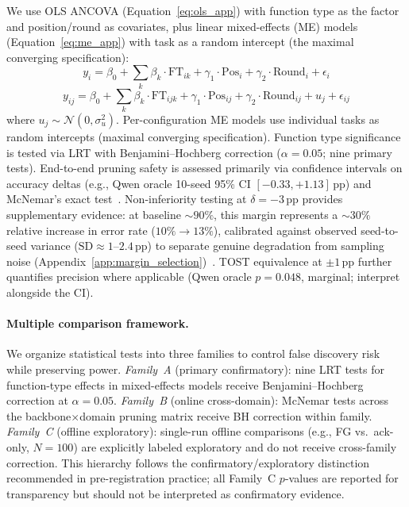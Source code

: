 We use OLS ANCOVA (Equation~\ref{eq:ols_app}) with function type as the factor and position/round as covariates, plus linear mixed-effects (ME) models (Equation~\ref{eq:me_app}) with task as a random intercept (the maximal converging specification):
\begin{equation}
    y_i = \beta_0 + \textstyle\sum_{k} \beta_k \cdot \text{FT}_{ik} + \gamma_1 \cdot \text{Pos}_i + \gamma_2 \cdot \text{Round}_i + \epsilon_i
\label{eq:ols_app}
\end{equation}
\begin{equation}
    y_{ij} = \beta_0 + \textstyle\sum_{k} \beta_k \cdot \text{FT}_{ijk} + \gamma_1 \cdot \text{Pos}_{ij} + \gamma_2 \cdot \text{Round}_{ij} + u_j + \epsilon_{ij}
\label{eq:me_app}
\end{equation}
where $u_j \sim \mathcal{N}(0, \sigma^2_u)$. Per-configuration ME models use individual tasks as random intercepts (maximal converging specification). Function type significance is tested via LRT with Benjamini--Hochberg correction ($\alpha = 0.05$; nine primary tests). End-to-end pruning safety is assessed primarily via confidence intervals on accuracy deltas (e.g., Qwen oracle 10-seed 95\% CI $[-0.33, +1.13]$\,pp) and McNemar's exact test~\citep{mcnemar_1947}. Non-inferiority testing at $\delta = -3$\,pp provides supplementary evidence: at baseline ${\sim}90\%$, this margin represents a ${\sim}30\%$ relative increase in error rate ($10\% \to 13\%$), calibrated against observed seed-to-seed variance ($\text{SD} \approx 1$--$2.4$\,pp) to separate genuine degradation from sampling noise (Appendix~\ref{app:margin_selection})~\citep{lakens_equivalence_2017}. TOST equivalence at $\pm 1$\,pp further quantifies precision where applicable (Qwen oracle $p = 0.048$, marginal; interpret alongside the CI).

\paragraph{Multiple comparison framework.} We organize statistical tests into three families to control false discovery risk while preserving power. \emph{Family~A} (primary confirmatory): nine LRT tests for function-type effects in mixed-effects models receive Benjamini--Hochberg correction at $\alpha = 0.05$. \emph{Family~B} (online cross-domain): McNemar tests across the backbone$\times$domain pruning matrix receive BH correction within family. \emph{Family~C} (offline exploratory): single-run offline comparisons (e.g., FG vs.\ ack-only, $N{=}100$) are explicitly labeled exploratory and do not receive cross-family correction. This hierarchy follows the confirmatory/exploratory distinction recommended in pre-registration practice; all Family~C $p$-values are reported for transparency but should not be interpreted as confirmatory evidence.

